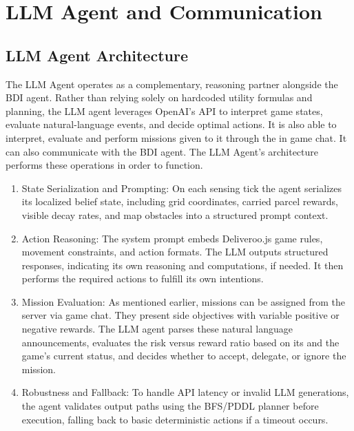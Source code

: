 \documentclass[11pt,a4paper]{article}
\begin{document}
\section{LLM Agent and Communication}
\subsection{LLM Agent Architecture}
The LLM Agent operates as a complementary, reasoning partner alongside the BDI agent. 
Rather than relying solely on hardcoded utility formulas and planning, the LLM agent leverages OpenAI's API to interpret game states, evaluate natural-language events, and decide optimal actions.
It is also able to interpret, evaluate and perform missions given to it through the in game chat. It can also communicate with the BDI agent.
The LLM Agent's architecture performs these operations in order to function.
\begin{enumerate}
    \item State Serialization and Prompting: On each sensing tick the agent serializes its localized belief state, including grid coordinates, carried parcel rewards, visible decay rates, and map obstacles into a structured prompt context.
    \item Action Reasoning: The system prompt embeds Deliveroo.js game rules, movement constraints, and action formats. 
    The LLM outputs structured responses, indicating its own reasoning and computations, if needed. It then performs the required actions to fulfill its own intentions.
    \item Mission Evaluation: As mentioned earlier, missions can be assigned from the server via game chat.
    They present side objectives with variable positive or negative rewards. 
    The LLM agent parses these natural language announcements, evaluates the risk versus reward ratio based on its and the game's current status, and decides whether to accept, delegate, or ignore the mission.  
    \item Robustness and Fallback: To handle API latency or invalid LLM generations, the agent validates output paths using the BFS/PDDL planner before execution, falling back to basic deterministic actions if a timeout occurs.
\end{enumerate}
\end{document}
